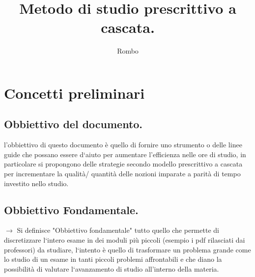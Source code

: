 \documentclass[11pt,a4paper]{article}
\begin{document}
\title{Metodo di studio prescrittivo a cascata.}
\author{Rombo}
\maketitle
\newpage

\section{Concetti preliminari}
 \subsection{Obbiettivo del documento. }
l'obbiettivo di questo documento è quello di fornire uno strumento o delle linee guide che possano essere d`aiuto per aumentare l'efficienza nelle ore di studio, in particolare si propongono delle strategie secondo modello prescrittivo a cascata per incrementare la qualità/ quantità delle nozioni imparate a parità di tempo investito nello studio.\\

\subsection{Obbiettivo Fondamentale.}
$\rightarrow$ Si definisce "Obbiettivo fondamentale" tutto quello che permette di discretizzare  l`intero esame in dei moduli più piccoli (esempio i pdf rilasciati dai professori) da studiare, l`intento è quello di trasformare un problema grande come lo studio di un esame in tanti piccoli problemi affrontabili e che diano la possibilità di valutare l`avanzamento di studio all'interno della materia.\\
\end{document}

